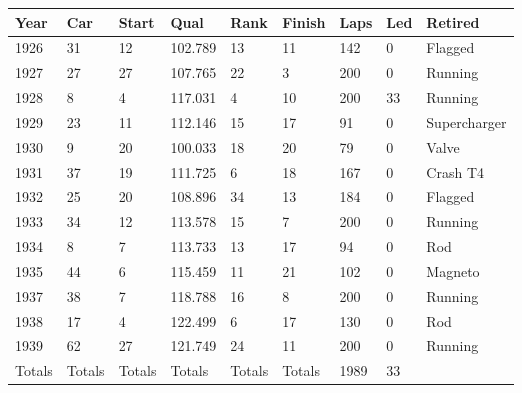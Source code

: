 \documentclass{article}
\begin{document}
\begin{tabular}{lllllllll}
\toprule
Year & Car & Start & Qual & Rank & Finish & Laps & Led & Retired \\
\midrule
1926 & 31 & 12 & 102.789 & 13 & 11 & 142 & 0 & Flagged \\
1927 & 27 & 27 & 107.765 & 22 & 3 & 200 & 0 & Running \\
1928 & 8 & 4 & 117.031 & 4 & 10 & 200 & 33 & Running \\
1929 & 23 & 11 & 112.146 & 15 & 17 & 91 & 0 & Supercharger \\
1930 & 9 & 20 & 100.033 & 18 & 20 & 79 & 0 & Valve \\
1931 & 37 & 19 & 111.725 & 6 & 18 & 167 & 0 & Crash T4 \\
1932 & 25 & 20 & 108.896 & 34 & 13 & 184 & 0 & Flagged \\
1933 & 34 & 12 & 113.578 & 15 & 7 & 200 & 0 & Running \\
1934 & 8 & 7 & 113.733 & 13 & 17 & 94 & 0 & Rod \\
1935 & 44 & 6 & 115.459 & 11 & 21 & 102 & 0 & Magneto \\
1937 & 38 & 7 & 118.788 & 16 & 8 & 200 & 0 & Running \\
1938 & 17 & 4 & 122.499 & 6 & 17 & 130 & 0 & Rod \\
1939 & 62 & 27 & 121.749 & 24 & 11 & 200 & 0 & Running \\
Totals & Totals & Totals & Totals & Totals & Totals & 1989 & 33 &  \\
\bottomrule
\end{tabular}
\end{document}
